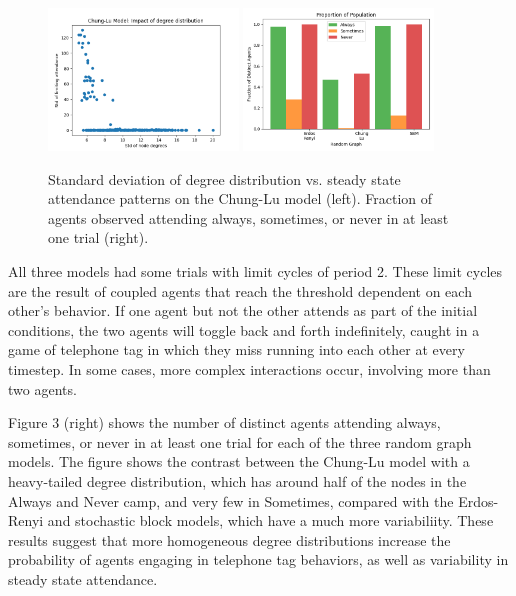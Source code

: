 \documentclass[12pt]{article}
\begin{document}
\begin{figure}
  \includegraphics[width=0.45\textwidth]{chung_lu_std.png}
  \includegraphics[width=0.45\textwidth]{always_sometimes_never.png}
  \caption{Standard deviation of degree distribution vs. steady state attendance patterns on the Chung-Lu model (left).  Fraction of agents observed attending always, sometimes, or never in at least one trial (right).}
\end{figure}

All three models had some trials with limit cycles of period 2.   These limit cycles are the result of coupled agents that reach the threshold dependent on each other's behavior.  If one agent but not the other attends as part of the initial conditions, the two agents will toggle back and forth indefinitely, caught in a game of telephone tag in which they miss running into each other at every timestep.  In some cases, more complex interactions occur, involving more than two agents.

Figure 3 (right) shows the number of distinct agents attending always, sometimes, or never in at least one trial for each of the three random graph models.  The figure shows the contrast between the Chung-Lu model with a heavy-tailed degree distribution, which has around half of the nodes in the Always and Never camp, and very few in Sometimes, compared with the Erdos-Renyi and stochastic block models, which have a much more variabiliity.  These results suggest that more homogeneous degree distributions increase the probability of agents engaging in telephone tag behaviors, as well as variability in steady state attendance.
\end{document}
